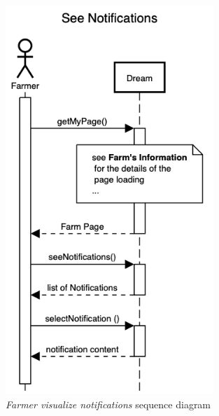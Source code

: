 \begin{enumerate}
\begin{figure}[H]
\begin{center}
        \includegraphics[width=0.7\textwidth]{sequence/SeeNotifications.png}
        \caption{\emph{Farmer visualize notifications} sequence diagram}
        \label{fig:state8}
        \end{center}
    \end{figure}


\end{enumerate}
